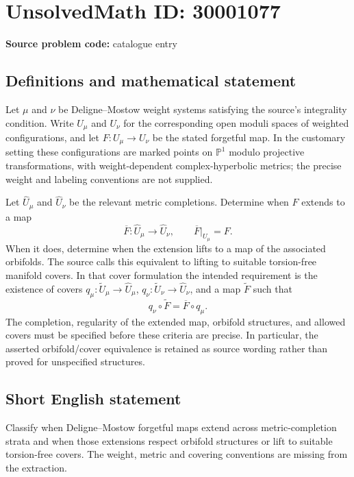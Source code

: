 \documentclass[11pt]{article}
\newcommand{\PP}{\mathbb{P}}
\begin{document}
\section*{UnsolvedMath ID: 30001077}
\textbf{Source problem code:} catalogue entry
\subsection{Definitions and mathematical statement}
Let \(\mu\) and \(\nu\) be Deligne--Mostow weight systems satisfying the source's integrality condition. Write \(U_\mu\) and \(U_\nu\) for the corresponding open moduli spaces of weighted configurations, and let \(F:U_\mu\to U_\nu\) be the stated forgetful map. In the customary setting these configurations are marked points on \(\PP^1\) modulo projective transformations, with weight-dependent complex-hyperbolic metrics; the precise weight and labeling conventions are not supplied.

Let \(\widehat U_\mu\) and \(\widehat U_\nu\) be the relevant metric completions. Determine when \(F\) extends to a map
\[
\overline F:\widehat U_\mu\longrightarrow\widehat U_\nu,
\qquad \overline F|_{U_\mu}=F.
\]
When it does, determine when the extension lifts to a map of the associated orbifolds. The source calls this equivalent to lifting to suitable torsion-free manifold covers. In that cover formulation the intended requirement is the existence of covers \(q_\mu:\widetilde U_\mu\to\widehat U_\mu\), \(q_\nu:\widetilde U_\nu\to\widehat U_\nu\), and a map \(\widetilde F\) such that
\[
q_\nu\circ\widetilde F=\overline F\circ q_\mu.
\]
The completion, regularity of the extended map, orbifold structures, and allowed covers must be specified before these criteria are precise. In particular, the asserted orbifold/cover equivalence is retained as source wording rather than proved for unspecified structures.
\subsection{Short English statement}
Classify when Deligne--Mostow forgetful maps extend across metric-completion strata and when those extensions respect orbifold structures or lift to suitable torsion-free covers. The weight, metric and covering conventions are missing from the extraction.
\end{document}
